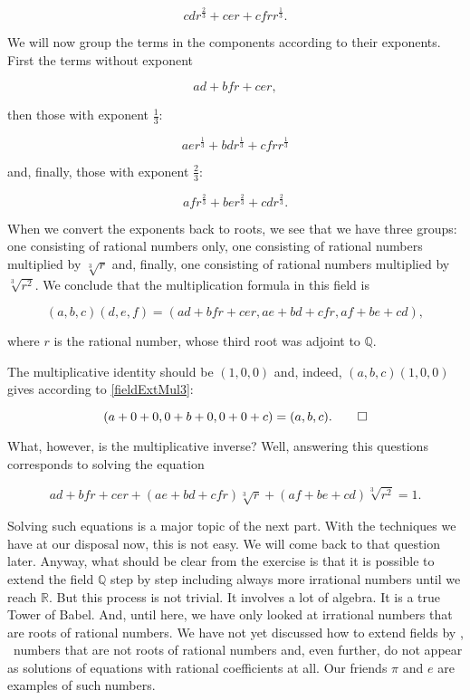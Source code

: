 \documentclass[tikz]{scrreprt}
\begin{document}
\[
cdr^{\frac{2}{3}}+cer+cfrr^{\frac{1}{3}}.
\]

We will now group the terms in the components according 
to their exponents. First the terms without exponent

\[
ad + bfr + cer,
\]

then those with exponent $\frac{1}{3}$:

\[
aer^{\frac{1}{3}} + bdr^{\frac{1}{3}} + cfrr^{\frac{1}{3}}
\]

and, finally, those with exponent $\frac{2}{3}$:

\[
afr^{\frac{2}{3}} + ber^{\frac{2}{3}} + cdr^{\frac{2}{3}}.
\]

When we convert the exponents back to roots, we see that
we have three groups:
one consisting of rational numbers only,
one consisting of rational numbers multiplied by $\sqrt[3]{r}$
and, finally, one consisting of rational numbers
multiplied by $\sqrt[3]{r^2}$.
We conclude that the multiplication formula in this field is

\begin{equation}\label{fieldExtMul3}
(a,b,c)(d,e,f) = (ad+bfr+cer,ae+bd+cfr,af+be+cd),
\end{equation}

where $r$ is the rational number, whose third root was
adjoint to $\mathbb{Q}$.

The multiplicative identity should be $(1,0,0)$ and, indeed,
$(a,b,c)(1,0,0)$ gives according to \ref{fieldExtMul3}:

\[
(a+0+0,0+b+0,0+0+c) = (a,b,c).\qed
\]

What, however, is the multiplicative inverse?
Well, answering this questions corresponds to solving
the equation

\begin{equation}
ad+bfr+cer + (ae+bd+cfr)\sqrt[3]{r} + (af+be+cd)\sqrt[3]{r^2} = 1.
\end{equation}

Solving such equations is a major topic of the next part.
With the techniques we have at our disposal now,
this is not easy. We will come back to that question later.
Anyway, what should be clear from the exercise is
that it is possible to extend the field $\mathbb{Q}$
step by step including always more irrational numbers
until we reach $\mathbb{R}$.
But this process is not trivial. It involves a lot of algebra.
It is a true Tower of Babel.
And, until here, we have only looked at irrational numbers
that are roots of rational numbers.
We have not yet discussed how to extend fields by 
, \ie\ numbers that
are not roots of rational numbers and, even further,
do not appear as solutions of equations with
rational coefficients at all. 
Our friends $\pi$ and $e$ are
examples of such numbers. 
\end{document}
